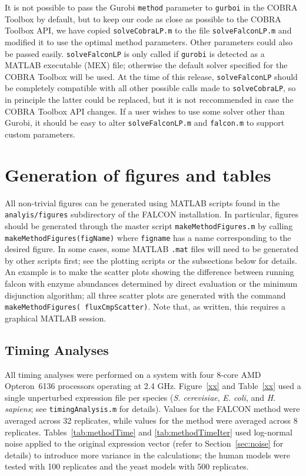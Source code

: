 It is not possible to pass the Gurobi \texttt{method} parameter to
\texttt{gurboi} in the COBRA Toolbox by default, but to keep our code
as close as possible to the COBRA Toolbox API, we have copied
\texttt{solveCobraLP.m} to the file \texttt{solveFalconLP.m} and
modified it to use the optimal method parameters. Other parameters
could also be passed easily. \texttt{solveFalconLP} is only called if
\texttt{gurobi} is detected as a MATLAB executable (MEX) file;
otherwise the default solver specified for the COBRA Toolbox will be
used. At the time of this release, \texttt{solveFalconLP} should be
completely compatible with all other possible calls made to
\texttt{solveCobraLP}, so in principle the latter could be replaced,
but it is not reccommended in case the COBRA Toolbox API changes. If a
user wishes to use some solver other than Gurobi, it should be easy to
alter \texttt{solveFalconLP.m} and \texttt{falcon.m} to support custom
parameters. 

\section{Generation of figures and tables}

All non-trivial figures can be generated using MATLAB scripts found in
the \texttt{analyis/figures} subdirectory of the FALCON installation.
In particular, figures should be generated through the master script
\texttt{makeMethodFigures.m} by calling
\texttt{makeMethodFigures(figName)} where \texttt{figname} has a name
corresponding to the desired figure.  In some cases, some MATLAB
\texttt{.mat} files will need to be generated by other scripts first;
see the plotting scripts or the subsections below for details. An
example is to make the scatter plots showing the difference between
running falcon with enzyme abundances determined by direct evaluation
or the minimum disjunction algorithm; all three scatter plots are
generated with the command \texttt{makeMethodFigures(\textquotesingle
fluxCmpScatter\textquotesingle)}. Note that, as written, this requires
a graphical MATLAB session.

\subsection{Timing Analyses}
All timing analyses were performed on a system with four 8-core AMD
Opteron\texttrademark\ 6136 processors operating at 2.4
GHz. Figure~\ref{xx} and \suppOrApp Table~\ref{xx} used a single
unperturbed expression file per species (\textit{S. cerevisiae},
\textit{E. coli}, and \textit{H. sapiens}; see
\texttt{timingAnalysis.m} for details). Values for the FALCON method
were averaged across 32 replicates, while values for the
\citealt{Lee2012} method were averaged across 8 replicates. \suppOrApp
Tables~\ref{tab:methodTime} and \ref{tab:methodTimeIter} used
log-normal noise applied to the original expression vector (refer to
Section~\ref{sec:noise} for details) to introduce more variance in the
calculations; the human models were tested with 100 replicates and the
yeast models with 500 replicates.

